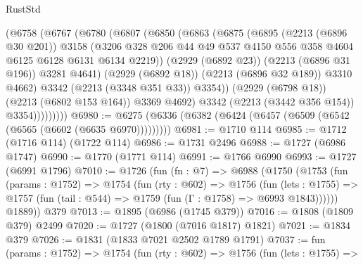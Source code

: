 \begin{lexlean}{RustStd}
\begin{coremodule}
                  (@6758
                    (@6767
                      (@6780
                        (@6807
                          (@6850
                            (@6863
                              (@6875
                                (@6895
                                  (@2213 (@6896 @30 @201))
                                  @3158
                                  (@3206
                                    @328
                                    @206
                                    @44
                                    @49
                                    @537
                                    @4150
                                    @556
                                    @358
                                    @4604
                                    @6125
                                    @6128
                                    @6131
                                    @6134
                                    @2219))
                                (@2929 (@6892 @23))
                                (@2213 (@6896 @31 @196))
                                @3281
                                @4641)
                              (@2929 (@6892 @18))
                              (@2213 (@6896 @32 @189))
                              @3310
                              @4662)
                            @3342
                            (@2213 (@3348 @351 @33))
                            @3354))
                        (@2929 (@6798 @18))
                        (@2213 (@6802 @153 @164))
                        @3369
                        @4692)
                      @3342
                      (@2213 (@3442 @356 @154))
                      @3354)))))))))
@6980 := @6275 (@6336 (@6382 (@6424 (@6457 (@6509 (@6542 (@6565 (@6602 (@6635 @6970)))))))))
@6981 := @1710 @114
@6985 := @1712 (@1716 @114) (@1722 @114)
@6986 := @1731 @2496
@6988 := @1727 (@6986 @1747)
@6990 := @1770 (@1771 @114)
@6991 := @1766 @6990
@6993 := @1727 (@6991 @1796)
@7010 := @1726
    (fun (fn : @7) =>
    @6988
      (@1750
        (@1753
          (fun (params : @1752) =>
          @1754
            (fun (rty : @602) =>
            @1756
              (fun (lets : @1755) =>
              @1757 (fun (tail : @544) => @1759 (fun (Γ : @1758) => @6993 @1843))))))
        @1889))
    @379
@7013 := @1895 (@6986 (@1745 @379))
@7016 := @1808 (@1809 @379) @2499
@7020 := @1727 (@1800 (@7016 @1817) @1821)
@7021 := @1834 @379
@7026 := @1831 (@1833 @7021 @2502 @1789 @1791)
@7037 := fun (params : @1752) =>
  @1754
    (fun (rty : @602) =>
    @1756
      (fun (lets : @1755) =>

\end{coremodule}
\end{lexlean}
